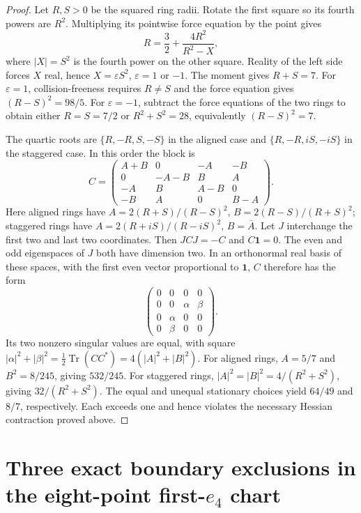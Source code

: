 \documentclass[11pt,a4paper]{article}
\theoremstyle{remark}
\begin{document}
\begin{proof}
Let $R,S>0$ be the squared ring radii. Rotate the first square so its
fourth powers are $R^2$. Multiplying its pointwise force equation by
the point gives
\[
 R=\frac32+\frac{4R^2}{R^2-X},
\]
where $|X|=S^2$ is the fourth power on the other square. Reality of
the left side forces $X$ real, hence $X=\varepsilon S^2$,
$\varepsilon=1$ or $-1$. The moment gives $R+S=7$.
For $\varepsilon=1$, collision-freeness requires $R\ne S$ and the
force equation gives $(R-S)^2=98/5$. For $\varepsilon=-1$, subtract
the force equations of the two rings to obtain either $R=S=7/2$ or
$R^2+S^2=28$, equivalently $(R-S)^2=7$.

The quartic roots are $\{R,-R,S,-S\}$ in the aligned case and
$\{R,-R,iS,-iS\}$ in the staggered case. In this order the block is
\[
 C=\begin{pmatrix}
 A+B&0&-A&-B\\
 0&-A-B&B&A\\
 -A&B&A-B&0\\
 -B&A&0&B-A
 \end{pmatrix}.
\]
Here aligned rings have
$A=2(R+S)/(R-S)^2$, $B=2(R-S)/(R+S)^2$; staggered rings have
$A=2(R+iS)/(R-iS)^2$, $B=\overline A$.
Let $J$ interchange the first two and last two coordinates. Then
$JCJ=-C$ and $C\mathbf1=0$. The even and odd eigenspaces of $J$
both have dimension two. In an orthonormal real basis of these
spaces, with the first even vector proportional to $\mathbf1$,
$C$ therefore has the form
\[
 \begin{pmatrix}
 0&0&0&0\\0&0&\alpha&\beta\\
 0&\alpha&0&0\\0&\beta&0&0
 \end{pmatrix}.
\]
Its two nonzero singular values are equal, with square
$|\alpha|^2+|\beta|^2=\tfrac12\operatorname{Tr}(CC^*)
=4(|A|^2+|B|^2)$.
For aligned rings, $A=5/7$ and $B^2=8/245$, giving $532/245$.
For staggered rings, $|A|^2=|B|^2=4/(R^2+S^2)$, giving
$32/(R^2+S^2)$. The equal and unequal stationary choices yield
$64/49$ and $8/7$, respectively. Each exceeds one and hence violates
the necessary Hessian contraction proved above.
\end{proof}


\section{Three exact boundary exclusions in the eight-point first-\texorpdfstring{\(e_4\)}{e4} chart}
\label{sec:first4-three-boundaries}
\end{document}
